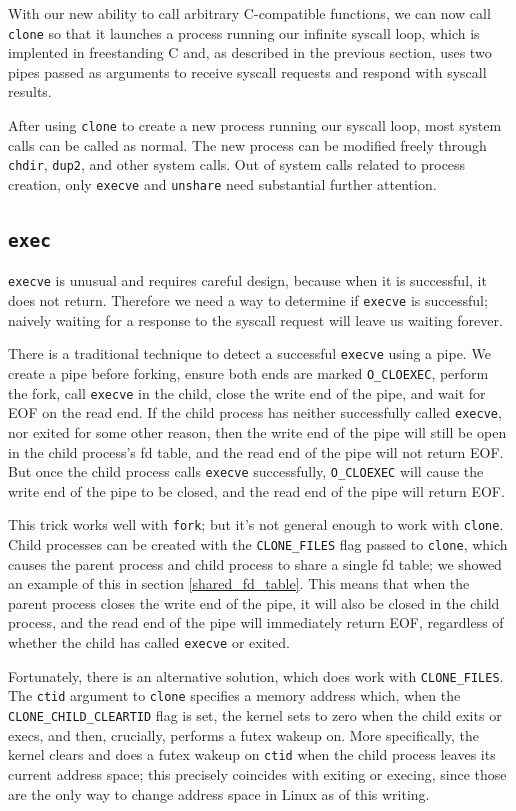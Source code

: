 \documentclass[sigplan]{acmart}
\begin{document}
With our new ability to call arbitrary C-compatible functions,
we can now call \texttt{clone} so that it launches a process running our infinite syscall loop,
which is implented in freestanding C and, as described in the previous section,
uses two pipes passed as arguments to receive syscall requests and respond with syscall results.

After using \texttt{clone} to create a new process running our syscall loop,
most system calls can be called as normal.
The new process can be modified freely through \texttt{chdir}, \texttt{dup2}, and other system calls.
Out of system calls related to process creation,
only \texttt{execve} and \texttt{unshare} need substantial further attention.
\subsection{\texttt{exec}}
\texttt{execve} is unusual and requires careful design,
because when it is successful, it does not return.
Therefore we need a way to determine if \texttt{execve} is successful;
naively waiting for a response to the syscall request will leave us waiting forever.

There is a traditional technique to detect a successful \texttt{execve} using a pipe.
We create a pipe before forking,
ensure both ends are marked \verb|O_CLOEXEC|,
perform the fork,
call \texttt{execve} in the child,
close the write end of the pipe,
and wait for EOF on the read end.
If the child process has neither successfully called \texttt{execve}, nor exited for some other reason,
then the write end of the pipe will still be open in the child process's fd table,
and the read end of the pipe will not return EOF.
But once the child process calls \texttt{execve} successfully,
\verb|O_CLOEXEC| will cause the write end of the pipe to be closed,
and the read end of the pipe will return EOF.

This trick works well with \texttt{fork};
but it's not general enough to work with \texttt{clone}.
Child processes can be created with the \verb|CLONE_FILES| flag passed to \texttt{clone},
which causes the parent process and child process to share a single fd table;
we showed an example of this in section \ref{shared_fd_table}.
This means that when the parent process closes the write end of the pipe,
it will also be closed in the child process,
and the read end of the pipe will immediately return EOF,
regardless of whether the child has called \texttt{execve} or exited.

Fortunately, there is an alternative solution, which does work with \verb|CLONE_FILES|.
The \texttt{ctid} argument to \texttt{clone} specifies a memory address which,
when the \verb|CLONE_CHILD_CLEARTID| flag is set,
the kernel sets to zero when the child exits or execs,
and then, crucially, performs a futex wakeup on.
More specifically,
the kernel clears and does a futex wakeup on \texttt{ctid} when the child process leaves its current address space;
this precisely coincides with exiting or execing,
since those are the only way to change address space in Linux as of this writing.
\end{document}
